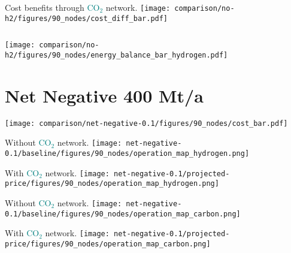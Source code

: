 \documentclass[12pt, aspectratio=169]{beamer}
\newcommand{\carbon}{\textcolor{teal}{CO$_2$}}
\begin{document}
\begin{frame}
    \begin{columns}
        Cost benefits through \carbon{} network.
        \texttt{[image: comparison/no-h2/figures/90\_nodes/cost\_diff\_bar.pdf]}
    \end{columns}
\end{frame}


\begin{frame}
    \texttt{[image: comparison/no-h2/figures/90\_nodes/energy\_balance\_bar\_hydrogen.pdf]}
\end{frame}


\section{Net Negative 400 Mt/a}

\begin{frame}
    \texttt{[image: comparison/net-negative-0.1/figures/90\_nodes/cost\_bar.pdf]}
\end{frame}


\begin{frame}
    \begin{center}
    Without \carbon{} network.
    \texttt{[image: net-negative-0.1/baseline/figures/90\_nodes/operation\_map\_hydrogen.png]}
    \end{center}
\end{frame}


\begin{frame}
    \begin{center}
    With \carbon{} network.
    \texttt{[image: net-negative-0.1/projected-price/figures/90\_nodes/operation\_map\_hydrogen.png]}
    \end{center}
\end{frame}


\begin{frame}
    \begin{center}
    Without \carbon{} network.
    \texttt{[image: net-negative-0.1/baseline/figures/90\_nodes/operation\_map\_carbon.png]}
    \end{center}
\end{frame}


\begin{frame}
    \begin{center}
    With \carbon{} network.
    \texttt{[image: net-negative-0.1/projected-price/figures/90\_nodes/operation\_map\_carbon.png]}
    \end{center}
\end{frame}
\end{document}
